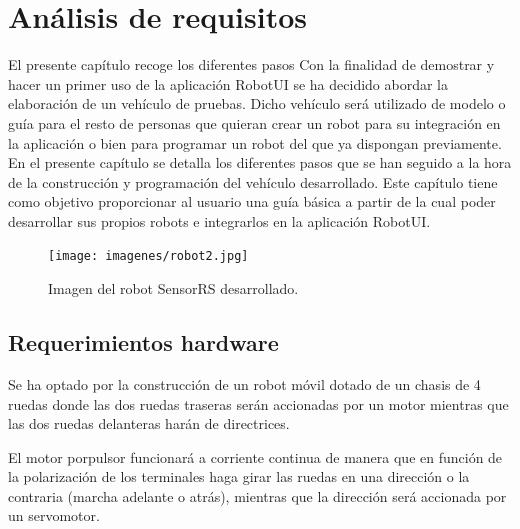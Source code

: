 

\newpage

\chapter{Análisis de requisitos}

\label{chap:analisis_requisitos}

El presente capítulo recoge los diferentes pasos 
Con la finalidad de demostrar y hacer un primer uso de la aplicación RobotUI se ha decidido abordar la elaboración de un vehículo de pruebas. Dicho vehículo será utilizado de modelo o guía para el 
resto de personas que quieran crear un robot para su integración en la aplicación o bien para programar un robot del que ya dispongan previamente.\\

En el presente capítulo se detalla los diferentes pasos que se han seguido a la hora de la construcción y programación del vehículo desarrollado. Este capítulo tiene como objetivo proporcionar al usuario
una guía básica a partir de la cual poder desarrollar sus propios robots e integrarlos en la aplicación RobotUI.\\


\begin{figure}[H]
  \begin{center}
   \texttt{[image: imagenes/robot2.jpg]}
  \end{center}
  \caption{Imagen del robot SensorRS desarrollado.}
  \label{robot:robot02}
\end{figure}


\section{Requerimientos hardware}
\label{sec:requerimientos-hardware}

Se ha optado por la construcción de un robot móvil dotado de un chasis de 4 ruedas donde las dos ruedas traseras serán accionadas por un motor mientras que las dos ruedas delanteras
harán de directrices.

El motor porpulsor funcionará a corriente continua de manera que en función de la polarización de los terminales haga girar las ruedas en una dirección o la contraria (marcha adelante o atrás), mientras que 
la dirección será accionada por un servomotor.\\

